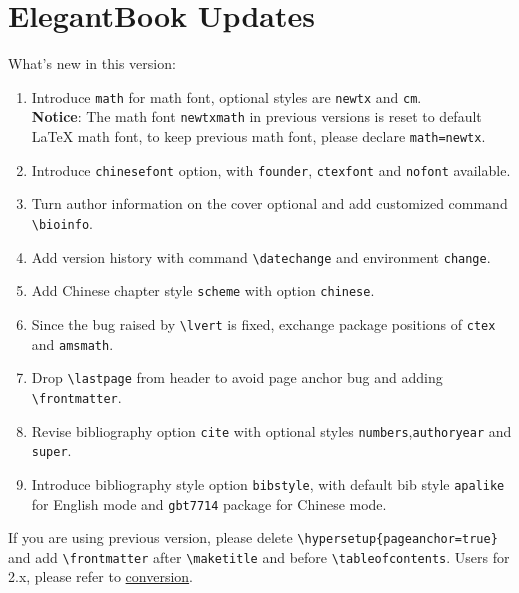 \documentclass[11pt]{elegantbook}
\begin{document}
\section{ElegantBook Updates}
What\rq s new in this version:
\begin{enumerate}
  \item Introduce \lstinline{math} for math font, optional styles are \lstinline{newtx} and \lstinline{cm}.\\
  \textbf{Notice}: The math font \lstinline{newtxmath} in previous versions is reset to default \LaTeX{} math font, to keep previous math font, please declare \lstinline{math=newtx}.
  \item Introduce \lstinline{chinesefont} option, with \lstinline{founder}, \lstinline{ctexfont} and \lstinline{nofont} available.
  \item Turn author information on the cover optional and add customized command \lstinline{\bioinfo}.
  \item Add version history with command \lstinline{\datechange} and environment \lstinline{change}.
  \item Add Chinese chapter style \lstinline{scheme} with option \lstinline{chinese}.
  \item Since the bug raised by \lstinline{\lvert} is fixed, exchange package positions of \lstinline{ctex} and \lstinline{amsmath}.
  \item Drop \lstinline{\lastpage} from header to avoid page anchor bug and adding \lstinline{\frontmatter}.
  \item Revise bibliography option \lstinline{cite} with optional styles \lstinline{numbers},\lstinline{authoryear} and \lstinline{super}.
  \item Introduce bibliography style option \lstinline{bibstyle}, with default bib style \lstinline{apalike} for English mode and \lstinline{gbt7714} package for Chinese mode.
\end{enumerate}


\begin{note}
  If you are using previous version, please delete \lstinline|\hypersetup{pageanchor=true}| and add \lstinline{\frontmatter} after \lstinline{\maketitle} and before \lstinline{\tableofcontents}. Users for 2.x, please refer to \href{https://github.com/ElegantLaTeX/ElegantBook/wiki/convert}{conversion}.
\end{note}
\end{document}
